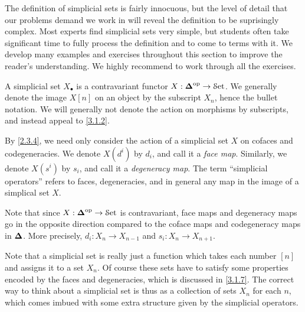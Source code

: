 The definition of simplicial sets is fairly innocuous, but the level of detail that our problems demand we work in will reveal the definition to be suprisingly complex. Most experts find simplicial sets very simple, but students often take significant time to fully process the definition and to come to terms with it. We develop many examples and exercises throughout this section to improve the reader's understanding. We highly recommend to work through all the exercises.

\begin{definition}\label{3.1.1}
    A simplicial set $X_{\bullet}$ is a contravariant functor $X : \boldsymbol{\Delta}^{\mathrm{op}}\to\mathcal{S}\mathrm{et}$. We generally denote the image $X[n]$ on an object by the subscript $X_n$, hence the bullet notation. We will generally not denote the action on morphisms by subscripts, and instead appeal to \cref{3.1.2}.
\end{definition}

\begin{notation}\label{3.1.2}
By \cref{2.3.4}, we need only consider the action of a simplicial set $X$ on cofaces and codegeneracies. We denote $X(d^i)$ by $d_i$, and call it a \emph{face map}. Similarly, we denote $X(s^i)$ by $s_i$, and call it a \emph{degeneracy map}. The term ``simplicial operators'' refers to faces, degeneracies, and in general any map in the image of a simplical set $X$.
\end{notation}

\begin{remark}\label{3.1.3}
    Note that since $X : \boldsymbol{\Delta}^{\mathrm{op}}\to\mathcal{S}\mathrm{et}$ is contravariant, face maps and degeneracy maps go in the opposite direction compared to the coface maps and codegeneracy maps in $\boldsymbol{\Delta}$. More precisely, $d_i : X_n\to X_{n-1}$ and $s_i : X_n\to X_{n+1}$.
\end{remark}

\begin{intuition}\label{3.1.4}
    Note that a simplicial set is really just a function which takes each number $[n]$ and assigns it to a set $X_n$. Of course these sets have to satisfy some properties encoded by the faces and degeneracies, which is discussed in \cref{3.1.7}. The correct way to think about a simplicial set is thus as a collection of sets $X_n$ for each $n$, which comes imbued with some extra structure given by the simplicial operators.
\end{intuition}

